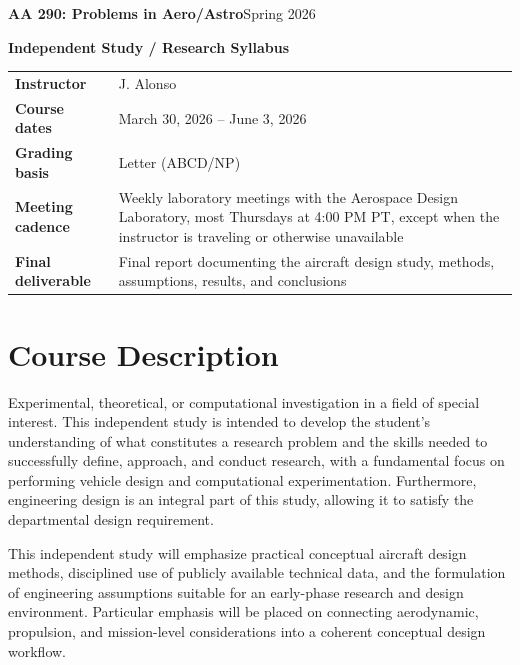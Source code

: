 \documentclass[10pt]{article}
\begin{document}
{\LARGE\bfseries AA 290: Problems in Aero/Astro}\hfill {\large Spring 2026}

{\bfseries Independent Study / Research Syllabus}

\vspace{0.4em}
\renewcommand{\arraystretch}{1.1}
\begin{tabularx}{\textwidth}{@{}>{\bfseries}p{1.45in}X@{}}
Instructor & J. Alonso \\
Course dates & March 30, 2026 -- June 3, 2026 \\
Grading basis & Letter (ABCD/NP) \\
Meeting cadence & Weekly laboratory meetings with the Aerospace Design Laboratory, most Thursdays at 4:00 PM PT, except when the instructor is traveling or otherwise unavailable \\
Final deliverable & Final report documenting the aircraft design study, methods, assumptions, results, and conclusions \\
\end{tabularx}

\section*{Course Description}
Experimental, theoretical, or computational investigation in a field of special interest. This independent study is intended to develop the student's understanding of what constitutes a research problem and the skills needed to successfully define, approach, and conduct research, with a fundamental focus on performing vehicle design and computational experimentation. Furthermore, engineering design is an integral part of this study, allowing it to satisfy the departmental design requirement.

This independent study will emphasize practical conceptual aircraft design methods, disciplined use of publicly available technical data, and the formulation of engineering assumptions suitable for an early-phase research and design environment. Particular emphasis will be placed on connecting aerodynamic, propulsion, and mission-level considerations into a coherent conceptual design workflow.
\end{document}
